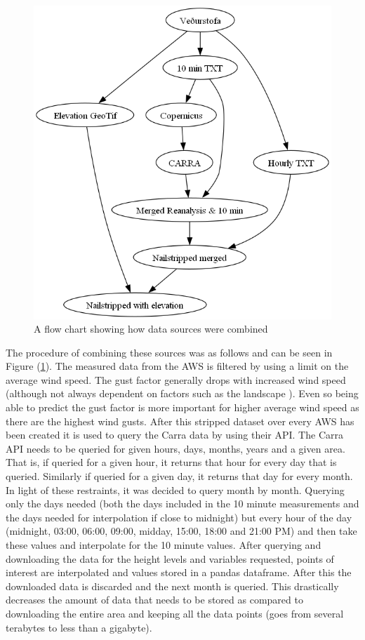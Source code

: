 \begin{figure}[h]
    \caption{A flow chart showing how data sources were combined}
    \label{fig:data_preprocessing_flow_chart}
    \includegraphics[scale = 0.5]{Figures/data-preprocessing-flow-chart.png}
\end{figure}

The procedure of combining these sources was as follows and can be seen in Figure (\ref{fig:data_preprocessing_flow_chart}). The measured data from the AWS is filtered by using a limit on the average wind speed. The gust factor generally drops with increased wind speed (although not always dependent on factors such as the landscape \cite{GNP_vidtal}). Even so being able to predict the gust factor is more important for higher average wind speed as there are the highest wind gusts. After this stripped dataset over every AWS has been created it is used to query the Carra data by using their API. The Carra API needs to be queried for given hours, days, months, years and a given area. That is, if queried for a given hour, it returns that hour for every day that is queried. Similarly if queried for a given day, it returns that day for every month. In light of these restraints, it was decided to query month by month. Querying only the days needed (both the days included in the 10 minute measurements and the days needed for interpolation if close to midnight) but every hour of the day (midnight, 03:00, 06:00, 09:00, midday, 15:00, 18:00 and 21:00 PM) and then take these values and interpolate for the 10 minute values. After querying and downloading the data for the height levels and variables requested, points of interest are interpolated and values stored in a pandas dataframe. After this the downloaded data is discarded and the next month is queried. This drastically decreases the amount of data that needs to be stored as compared to downloading the entire area and keeping all the data points (goes from several terabytes to less than a gigabyte).

